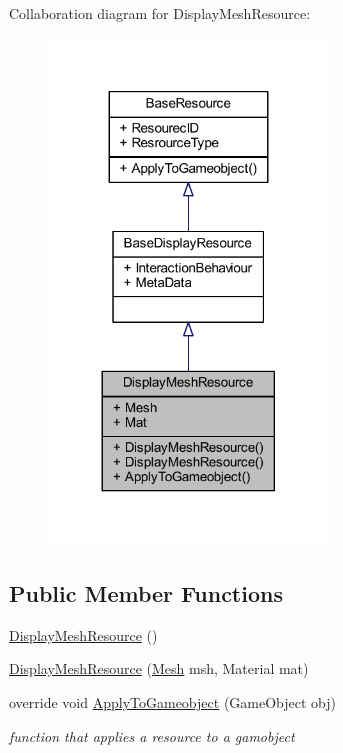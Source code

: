 Collaboration diagram for Display\+Mesh\+Resource\+:\nopagebreak
\begin{figure}[H]
\begin{center}
\leavevmode
\includegraphics[width=209pt]{class_display_mesh_resource__coll__graph}
\end{center}
\end{figure}
\subsection*{Public Member Functions}
\begin{DoxyCompactItemize}
\item 
\mbox{\hyperlink{class_display_mesh_resource_ab51d570e0165de27fc603b69ae026e6b}{Display\+Mesh\+Resource}} ()
\item 
\mbox{\hyperlink{class_display_mesh_resource_aa4b6bc70724de2c056737f015cad4a41}{Display\+Mesh\+Resource}} (\mbox{\hyperlink{class_display_mesh_resource_a3ea74e82fc6354c0d84ed87b996e64d9}{Mesh}} msh, Material mat)
\item 
override void \mbox{\hyperlink{class_display_mesh_resource_a62672f28a402bebeed1cb79fcca81828}{Apply\+To\+Gameobject}} (Game\+Object obj)
\begin{DoxyCompactList}\small\item\em function that applies a resource to a gamobject \end{DoxyCompactList}\end{DoxyCompactItemize}

